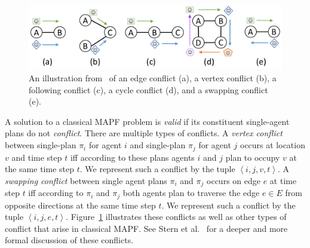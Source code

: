 \documentclass[review]{elsarticle}
\newcommand{\tuple}[1]{\ensuremath{\left \langle #1 \right \rangle }}
\newcommand\roni[1]{\nb{\textbf{Roni:}}{green}{#1}}
\newcommand\dor[1]{\nb{\textbf{Dor:}}{Fuchsia}{#1}}
\begin{document}
\begin{figure}
    \centering
    \includegraphics[width=\columnwidth]{types-of-conflicts.pdf}
    \caption{An illustration from~\cite{stern2019mapf} of an edge conflict (a), a vertex conflict (b), a following conflict (c), a cycle conflict (d), and a swapping conflict (e).}
    \label{fig:types-of-conflicts}
\end{figure}

A solution to a classical MAPF problem is \emph{valid} if its constituent single-agent plans do not \emph{conflict}. 
There are multiple types of conflicts. 
A \emph{vertex conflict} between single-plan $\pi_i$ for agent $i$ 
and single-plan $\pi_j$ for agent $j$ occurs at location $v$ and time step $t$ iff according to these plans agents $i$ and $j$ plan to occupy $v$ at the same time step $t$. We represent such a conflict by the tuple $\tuple{i,j,v,t}$. 
A \emph{swapping conflict} between single agent plans $\pi_i$ and $\pi_j$ occurs on edge $e$ at time step $t$ iff according to $\pi_i$ and $\pi_j$ both agents plan to traverse the edge $e\in E$ from opposite directions at the same time step $t$. We represent such a conflict by the tuple $\tuple{i,j,e,t}$. 
Figure~\ref{fig:types-of-conflicts} illustrates these conflicts as well as other types of conflict that arise in classical MAPF. See Stern et al.~\cite{stern2019mapf} for a deeper and more formal discussion of these conflicts. 

\end{document}
